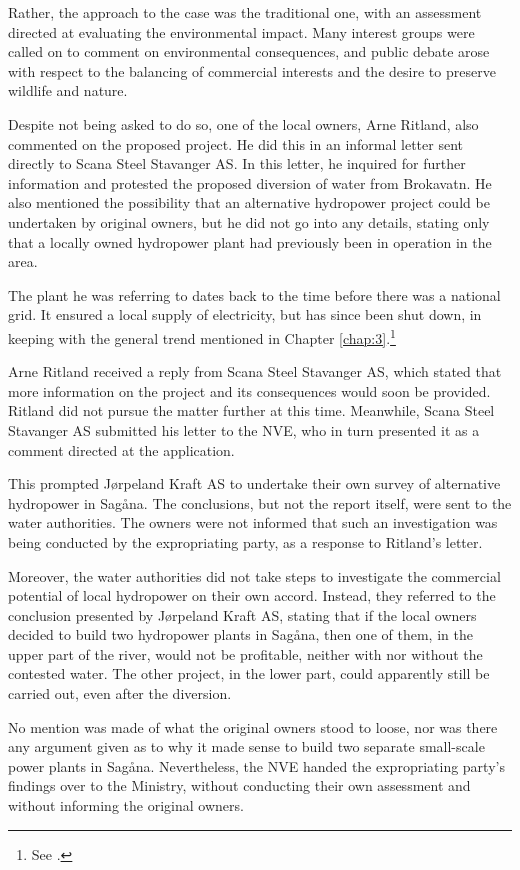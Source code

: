 Rather, the approach to the case was the traditional one, with an assessment directed at evaluating the environmental impact. Many interest groups were called on to comment on environmental consequences, and public debate arose with respect to the balancing of commercial interests and the desire to preserve wildlife and nature.

Despite not being asked to do so, one of the local owners, Arne Ritland, also commented on the proposed project. He did this in an informal letter sent directly to Scana Steel Stavanger AS. In this letter, he inquired for further information and protested the proposed diversion of water from Brokavatn. He also mentioned the possibility that an alternative hydropower project could be undertaken by original owners, but he did not go into any details, stating only that a locally owned hydropower plant had previously been in operation in the area. 

The plant he was referring to dates back to the time before there was a national grid. It ensured a local supply of electricity, but has since been shut down, in keeping with the general trend mentioned in Chapter \ref{chap:3}.\footnote{See \cite{jorpeland09}.}

Arne Ritland received a reply from Scana Steel Stavanger AS, which stated that more information on the project and its consequences would soon be provided. Ritland did not pursue the matter further at this time. Meanwhile, Scana Steel Stavanger AS submitted his letter to the NVE, who in turn presented it as a comment directed at the application. 

This prompted Jørpeland Kraft AS to undertake their own survey of alternative hydropower in Sagåna. The conclusions, but not the report itself, were sent to the water authorities. The owners were not informed that such an investigation was being conducted by the expropriating party, as a response to Ritland's letter.

Moreover, the water authorities did not take steps to investigate the commercial potential of local hydropower on their own accord. Instead, they referred to the conclusion presented by Jørpeland Kraft AS, stating that if the local owners decided to build two hydropower plants in Sagåna, then one of them, in the upper part of the river, would not be profitable, neither with nor without the contested water. The other project, in the lower part, could apparently still be carried out, even after the diversion. 

No mention was made of what the original owners stood to loose, nor was there any argument given as to why it made sense to build two separate small-scale power plants in Sagåna. Nevertheless, the NVE handed the expropriating party's findings over to the Ministry, without conducting their own assessment and without informing the original owners.

